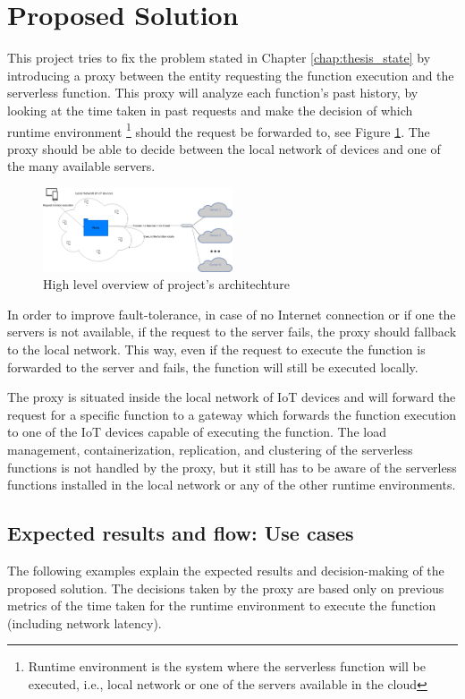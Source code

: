 \documentclass[conference]{IEEEtran}
\begin{document}
\section{Proposed Solution}

This project tries to fix the problem stated in Chapter \ref{chap:thesis_state} by
introducing a proxy between the entity requesting the function execution and the
serverless function. This proxy will analyze each function's past history, by
looking at the time taken in past requests and make the decision of which runtime
environment \footnote{Runtime environment is the system where the serverless
function will be executed, i.e., local network or one of the servers available in
the cloud} should the request be forwarded to, see Figure
\ref{fig:request_func_high_level_diagram}. The proxy should be able to decide
between the local network of devices and one of the many available servers.

\begin{figure}[ht]
  \centering
  \includegraphics[width=0.5\textwidth]{diss-high-level-diagram.png}
  \caption{High level overview of project's architechture}
  \label{fig:request_func_high_level_diagram}
\end{figure}

In order to improve fault-tolerance, in case of no Internet connection or if
one the servers is not available, if the request to the server fails, the proxy
should fallback to the local network. This way, even if the request to execute the
function is forwarded to the server and fails, the function will still be executed
locally.

The proxy is situated inside the local network of IoT devices and will forward the
request for a specific function to a gateway which forwards the function execution to
one of the IoT devices capable of executing the function. The load management,
containerization, replication, and clustering of the serverless functions is not
handled by the proxy, but it still has to be aware of the serverless functions
installed in the local network or any of the other runtime environments.

\subsection{Expected results and flow: Use cases}
\label{overview:usecases}
The following examples explain the expected results and decision-making of the
proposed solution. The decisions taken by the proxy are based only on previous
metrics of the time taken for the runtime environment to execute the function
(including network latency).
\end{document}

